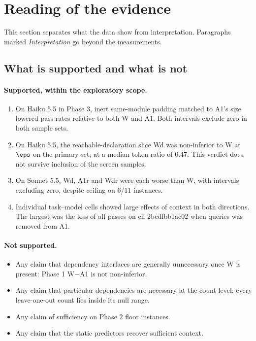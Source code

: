 \section{Reading of the evidence}

This section separates what the data show from interpretation. Paragraphs marked \emph{Interpretation} go beyond the measurements.

\subsection{What is supported and what is not}

\paragraph{Supported, within the exploratory scope.}
\begin{enumerate}
\item On Haiku 5.5 in Phase 3, inert same-module padding matched to A1's size lowered pass rates relative to both W and A1. Both intervals exclude zero in both sample sets.
\item On Haiku 5.5, the reachable-declaration slice Wd was non-inferior to W at $\eps$ on the primary set, at a median token ratio of 0.47. This verdict does not survive inclusion of the screen samples.
\item On Sonnet 5.5, Wd, A1r and Wdr were each worse than W, with intervals excluding zero, despite ceiling on 6/11 instances.
\item Individual task--model cells showed large effects of context in both directions. The largest was the loss of all passes on cli 2bcdfbb1ac02 when queries was removed from A1.
\end{enumerate}

\paragraph{Not supported.}
\begin{itemize}
\item Any claim that dependency interfaces are generally unnecessary once W is present: Phase 1 W$-$A1 is not non-inferior.
\item Any claim that particular dependencies are necessary at the count level: every leave-one-out count lies inside its null range.
\item Any claim of sufficiency on Phase 2 floor instances.
\item Any claim that the static predictors recover sufficient context.
\end{itemize}

